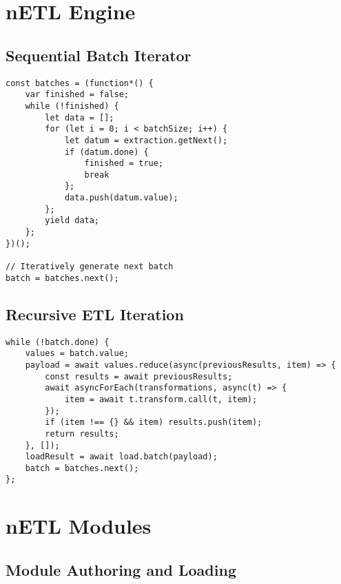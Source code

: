 \section{nETL Engine}
\subsection{Sequential Batch Iterator}
\label{netl-batch-generator}
\begin{verbatim}
const batches = (function*() {
    var finished = false;
    while (!finished) {
        let data = [];
        for (let i = 0; i < batchSize; i++) {
            let datum = extraction.getNext();
            if (datum.done) {
                finished = true;
                break
            };
            data.push(datum.value);
        };
        yield data;
    };
})();

// Iteratively generate next batch
batch = batches.next();
\end{verbatim}





\subsection{Recursive ETL Iteration}
\label{netl-task-iterator}
\begin{verbatim}
while (!batch.done) {
    values = batch.value;
    payload = await values.reduce(async(previousResults, item) => {
        const results = await previousResults;
        await asyncForEach(transformations, async(t) => {
            item = await t.transform.call(t, item);
        });
        if (item !== {} && item) results.push(item);
        return results;
    }, []);
    loadResult = await load.batch(payload);
    batch = batches.next();
};
\end{verbatim}

\section{nETL Modules}
\label{netl-modules}

\subsection{Module Authoring and Loading}
\label{netl-module-loading}

